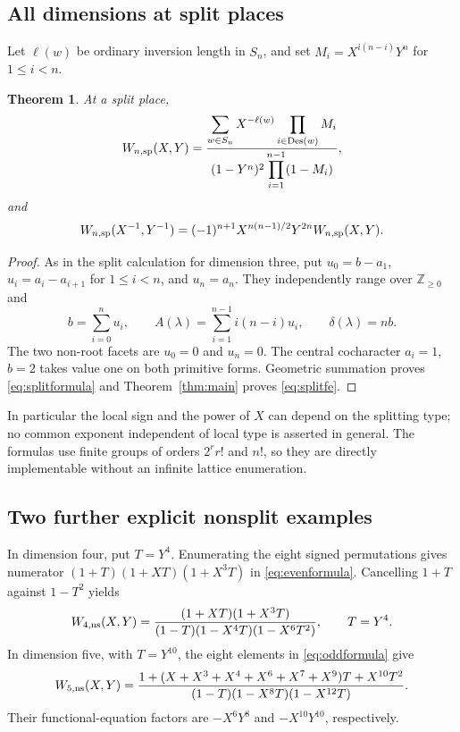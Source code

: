 \documentclass[11pt,a4paper]{article}
\newtheorem{theorem}{Theorem}
\theoremstyle{definition}
\newcommand{\Z}{\mathbb Z}
\newcommand{\Des}{\operatorname{Des}}
\begin{document}
\subsection{All dimensions at split places}
Let $\ell(w)$ be ordinary inversion length in $S_n$, and set
$M_i=X^{i(n-i)}Y^n$ for $1\leq i<n$.
\begin{theorem}\label{thm:split}
At a split place,
\begin{equation}\label{eq:splitformula}
 W_{n,\rm sp}(X,Y)=
 \frac{\displaystyle\sum_{w\in S_n}X^{-\ell(w)}
                            \prod_{i\in\Des(w)}M_i}
 {(1-Y^n)^2\displaystyle\prod_{i=1}^{n-1}(1-M_i)},
\end{equation}
and
\begin{equation}\label{eq:splitfe}
 W_{n,\rm sp}(X^{-1},Y^{-1})
 =(-1)^{n+1}X^{n(n-1)/2}Y^{2n}W_{n,\rm sp}(X,Y).
\end{equation}
\end{theorem}
\begin{proof}
As in the split calculation for dimension three, put
$u_0=b-a_1$, $u_i=a_i-a_{i+1}$ for $1\leq i<n$, and
$u_n=a_n$. They independently range over $\Z_{\geq0}$ and
\[
 b=\sum_{i=0}^nu_i,\qquad
 A(\lambda)=\sum_{i=1}^{n-1}i(n-i)u_i,\qquad
 \delta(\lambda)=nb.
\]
The two non-root facets are $u_0=0$ and $u_n=0$. The central
cocharacter $a_i=1$, $b=2$ takes value one on both primitive
forms. Geometric summation proves \eqref{eq:splitformula} and
Theorem~\ref{thm:main} proves \eqref{eq:splitfe}.
\end{proof}
In particular the local sign and the power of $X$ can depend on the
splitting type; no common exponent independent of local type is
asserted in general. The formulas use finite groups of orders
$2^rr!$ and $n!$, so they are directly implementable without an
infinite lattice enumeration.

\subsection{Two further explicit nonsplit examples}
In dimension four, put $T=Y^4$. Enumerating the eight signed
permutations gives numerator
$(1+T)(1+XT)(1+X^3T)$ in \eqref{eq:evenformula}.
Cancelling $1+T$ against $1-T^2$ yields
\begin{equation}\label{eq:GU4}
 W_{4,\rm ns}(X,Y)=
 \frac{(1+XT)(1+X^3T)}{(1-T)(1-X^4T)(1-X^6T^2)},\qquad T=Y^4.
\end{equation}
In dimension five, with $T=Y^{10}$, the eight elements in
\eqref{eq:oddformula} give
\begin{equation}\label{eq:GU5}
 W_{5,\rm ns}(X,Y)=
 \frac{1+(X+X^3+X^4+X^6+X^7+X^9)T+X^{10}T^2}
      {(1-T)(1-X^8T)(1-X^{12}T)}.
\end{equation}
Their functional-equation factors are $-X^6Y^8$ and $-X^{10}Y^{10}$,
respectively.
\end{document}

